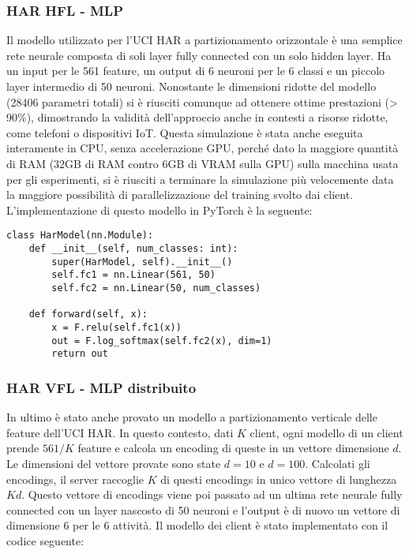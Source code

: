\subsubsection{HAR HFL - MLP}
Il modello utilizzato per l'UCI HAR a partizionamento orizzontale 
è una semplice rete neurale composta di soli layer fully connected 
con un solo hidden layer. Ha un input per le 561 feature, un output 
di 6 neuroni per le 6 classi e un piccolo layer intermedio di 50 neuroni.
Nonostante le dimensioni ridotte del modello (28406 parametri totali)
si è riusciti comunque ad ottenere ottime prestazioni (> 90\%),
dimostrando la validità dell'approccio anche in contesti a risorse
ridotte, come telefoni o dispositivi IoT. Questa simulazione è stata 
anche eseguita interamente in CPU, senza accelerazione GPU, perché 
dato la maggiore quantità di RAM (32GB di RAM contro 6GB di VRAM
sulla GPU) sulla macchina usata per gli esperimenti, si è riusciti a 
terminare la simulazione più velocemente data la maggiore possibilità
di parallelizzazione del training svolto dai client. L'implementazione
di questo modello in PyTorch è la seguente:

\begin{lstlisting}
class HarModel(nn.Module):
    def __init__(self, num_classes: int):
        super(HarModel, self).__init__()
        self.fc1 = nn.Linear(561, 50)
        self.fc2 = nn.Linear(50, num_classes)

    def forward(self, x):
        x = F.relu(self.fc1(x))
        out = F.log_softmax(self.fc2(x), dim=1)
        return out
\end{lstlisting}


\subsubsection{HAR VFL - MLP distribuito}
In ultimo è stato anche provato un modello a partizionamento verticale 
delle feature dell'UCI HAR. In questo contesto, dati \(K\) client,
ogni modello di un client prende \(561/K\) feature e calcola un encoding 
di queste in un vettore dimensione \(d\). Le dimensioni del vettore 
provate sono state \(d=10\) e \(d=100\). Calcolati gli encodings, 
il server raccoglie \(K\) di questi encodings in unico vettore di lunghezza
\(Kd\). Questo vettore di encodings viene poi passato ad un ultima rete 
neurale fully connected con un layer nascosto di 50 neuroni e 
l'output è di nuovo un vettore di dimensione 6 per le 6 attività. Il 
modello dei client è stato implementato con il codice seguente:

